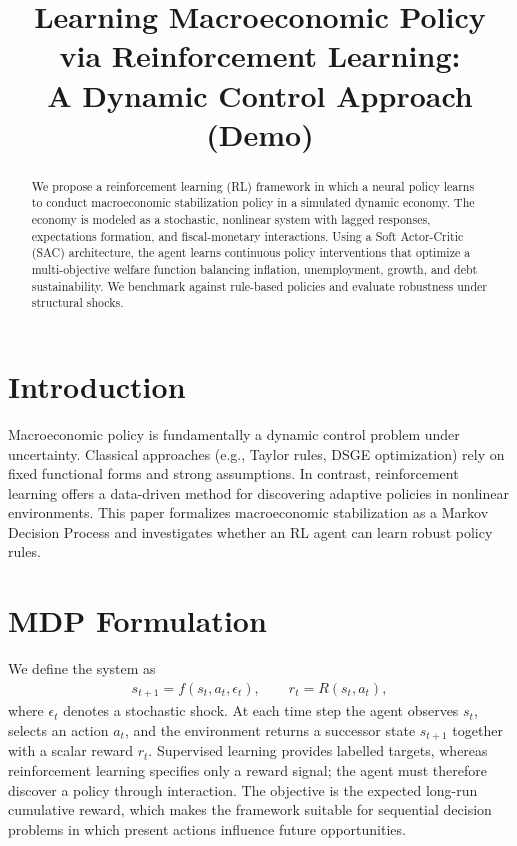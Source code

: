 \documentclass[11pt]{article}
\title{Learning Macroeconomic Policy via Reinforcement Learning: \\ A Dynamic Control Approach (Demo) }
\author{}
\date{}
\begin{document}
\maketitle

\begin{abstract}
We propose a reinforcement learning (RL) framework in which a neural policy learns to conduct macroeconomic stabilization policy in a simulated dynamic economy. The economy is modeled as a stochastic, nonlinear system with lagged responses, expectations formation, and fiscal-monetary interactions. Using a Soft Actor-Critic (SAC) architecture, the agent learns continuous policy interventions that optimize a multi-objective welfare function balancing inflation, unemployment, growth, and debt sustainability. We benchmark against rule-based policies and evaluate robustness under structural shocks.
\end{abstract}

\section{Introduction}
Macroeconomic policy is fundamentally a dynamic control problem under uncertainty. Classical approaches (e.g., Taylor rules, DSGE optimization) rely on fixed functional forms and strong assumptions. In contrast, reinforcement learning offers a data-driven method for discovering adaptive policies in nonlinear environments. This paper formalizes macroeconomic stabilization as a Markov Decision Process and investigates whether an RL agent can learn robust policy rules.

\section{MDP Formulation}
We define the system as
\begin{align}
    s_{t+1} = f(s_t, a_t, \epsilon_t), \qquad r_t = R(s_t, a_t),
\end{align}
where $\epsilon_t$ denotes a stochastic shock. At each time step the agent observes $s_t$, selects an action $a_t$, and the environment returns a successor state $s_{t+1}$ together with a scalar reward $r_t$. Supervised learning provides labelled targets, whereas reinforcement learning specifies only a reward signal; the agent must therefore discover a policy through interaction. The objective is the expected long-run cumulative reward, which makes the framework suitable for sequential decision problems in which present actions influence future opportunities.
\end{document}

